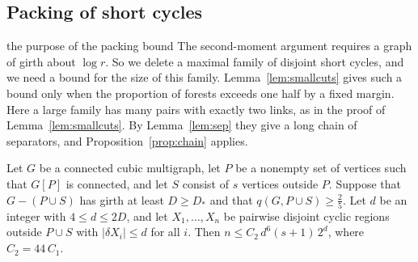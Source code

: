 \subsection{Packing of short cycles}\label{sec:packing}

\begin{idea}{the purpose of the packing bound}
The second-moment argument requires a graph of girth about $\log r$. So we delete a maximal
family of disjoint short cycles, and we need a bound for the size of this family.
Lemma~\ref{lem:smallcuts} gives such a bound only when the proportion of forests exceeds one half
by a fixed margin. Here a large family has many pairs with exactly two links, as in the proof of
Lemma~\ref{lem:smallcuts}. By Lemma~\ref{lem:sep} they give a long chain of separators, and
Proposition~\ref{prop:chain} applies.
\end{idea}

\begin{proposition}[Packing]\label{prop:packing}
Let $G$ be a connected cubic multigraph, let $P$ be a nonempty set of vertices such that $G[P]$
is connected, and let $S$ consist of $s$ vertices outside $P$. Suppose that $G-(P\cup S)$ has
girth at least $D\ge D_*$ and that $q(G,P\cup S)\ge\frac25$. Let $d$ be an integer with
$4\le d\le2D$, and let $X_1,\ldots,X_n$ be pairwise disjoint cyclic regions outside $P\cup S$
with $|\delta X_i|\le d$ for all $i$. Then $n\le C_2\,d^{6}(s+1)\,2^{d}$, where
$C_2=44\,C_1$.
\end{proposition}

